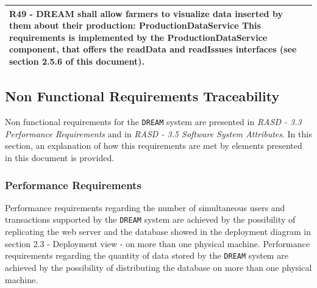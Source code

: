 \documentclass{article}
\begin{document}
\begin{longtable}[c]{|m{11.75cm}|}
    \textbf{R49 - DREAM shall allow farmers to visualize data inserted by them about their production: ProductionDataService}
    \newline\newline
    This requirements is implemented by the ProductionDataService component, that offers the readData and readIssues interfaces (see section 2.5.6 of this document). \\
    \hline
\end{longtable}

\subsection{Non Functional Requirements Traceability}
Non functional requirements for the \verb|DREAM| system are presented in \textit{RASD - 3.3 Performance Requirements} and in \textit{RASD - 3.5 Software System Attributes}. In this section, an explanation of how this requirements are met by elements presented in this document is provided.

\subsubsection{Performance Requirements}
Performance requirements regarding the number of simultaneous users and transactions supported by the \verb|DREAM| system are achieved by the possibility of replicating the web server and the database showed in the deployment diagram in section 2.3 - Deployment view - on more than one physical machine. \newline
Performance requirements regarding the quantity of data stored by the \verb|DREAM| system are achieved by the possibility of distributing the database on more than one physical machine.
\end{document}
